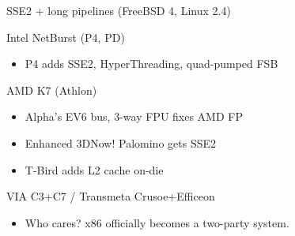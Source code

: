 \documentclass[mathserif,xcolor={dvipsnames,table}]{beamer}
\begin{document}
\begin{frame}[t]{SSE2 + long pipelines (FreeBSD 4, Linux 2.4)}
\begin{block}{Intel NetBurst (P4, PD)}
\begin{itemize}
\item P4 adds SSE2, HyperThreading, quad-pumped FSB
\end{itemize}
\end{block}
\begin{block}{AMD K7 (Athlon)}
\begin{itemize}
\item Alpha's EV6 bus, 3-way FPU fixes AMD FP
\item Enhanced 3DNow! Palomino gets SSE2
\item T-Bird adds L2 cache on-die
\end{itemize}
\end{block}
\begin{block}{VIA C3+C7 / Transmeta Crusoe+Efficeon}
\begin{itemize}
\item Who cares? x86 officially becomes a two-party system.
\end{itemize}
\end{block}
\vfill
\begin{center}
\end{center}
\end{frame}
\end{document}
